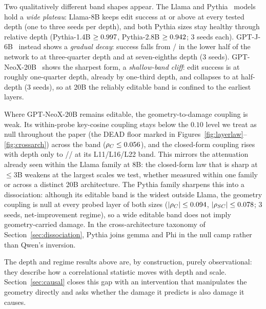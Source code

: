 Two qualitatively different band shapes appear. The Llama and
Pythia~\citep{biderman2023pythia} models
hold a \emph{wide plateau}: Llama-8B keeps edit success at or above
\llamaEightEsrMin{} at every tested depth (one to three seeds per depth), and
both Pythia sizes stay healthy through \pythiaHealthyDepth{} relative depth
(Pythia-1.4B $\geq0.997{}$, Pythia-2.8B
$\geq0.942{}$; 3 seeds each). GPT-J-6B~\citep{wang2021gptj}
instead shows a
\emph{gradual decay}: success falls from \gptjEsrA{}/\gptjEsrB{} in the lower
half of the network to \gptjEsrC{} at three-quarter depth and \gptjEsrD{} at
seven-eighths depth (3 seeds). GPT-NeoX-20B~\citep{black2022neox} shows the
sharpest form, a
\emph{shallow-band cliff}: edit success is \neoxEsrShallow{} at roughly
one-quarter depth, already \neoxEsrMid{} by one-third depth, and collapses to
\neoxEsrHalf{} at half-depth (3 seeds), so at 20B the reliably editable band is
confined to the earliest layers.

Where GPT-NeoX-20B remains editable, the geometry-to-damage coupling is weak.
Its within-probe key-cosine coupling stays below the $0.10$ level we treat as
null throughout the paper (the DEAD floor marked in
Figures~\ref{fig:layerlaw}--\ref{fig:crossarch}) across the band
($\rho_C\leq0.056{}$), and the closed-form
\SxC{} coupling rises with depth only to
\neoxRhoSCa{}/\neoxRhoSCb{}/\neoxRhoSCc{} at its L11/L16/L22 band. This mirrors
the attenuation already seen within the Llama family at 8B: the closed-form law
that is sharp at $\leq$3B weakens at the largest scales we test, whether
measured within one family or across a distinct 20B architecture. The Pythia
family sharpens this into a dissociation: although its editable band is the
widest outside Llama, the geometry coupling is null at every probed layer of
both sizes
($|\rho_C|\leq0.094{}$, $|\rho_{SC}|\leq0.078{}$;
3 seeds, net-improvement regime), so a wide editable band does not imply
geometry-carried damage. In the cross-architecture taxonomy of
Section~\ref{sec:dissociation}, Pythia joins gemma and Phi in the null camp
rather than Qwen's inversion.



The depth and regime results above are, by construction, purely
observational: they describe how a correlational statistic moves with depth
and scale. Section~\ref{sec:causal} closes this gap with an intervention
that manipulates the geometry directly and asks whether the damage it
predicts is also damage it causes.
